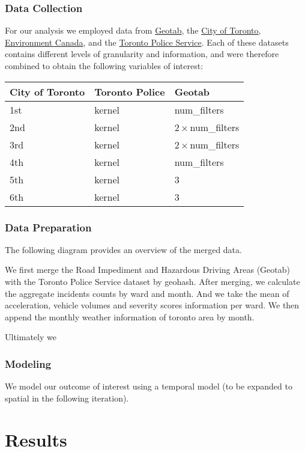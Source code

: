 \documentclass[]{article}
\begin{document}
\subsubsection{Data Collection}\label{data-collection}

For our analysis we employed data from
\href{https://www.data.geotab.com}{Geotab}, the
\href{https://www.toronto.ca/city-government/data-research-maps}{City of
Toronto},
\href{http://climate.weather.gc.ca/historical_data/search_historic_data_e.html}{Environment
Canada}, and the \href{http://data.torontopolice.on.ca}{Toronto Police
Service}. Each of these datasets contains different levels of
granularity and information, and were therefore combined to obtain the
following variables of interest:

\begin{longtable}[]{@{}lll@{}}
\toprule
City of Toronto & Toronto Police & Geotab\tabularnewline
\midrule
\endhead
1st & kernel & num\_filters\tabularnewline
2nd & kernel & \(2 \times\)num\_filters\tabularnewline
3rd & kernel & \(2 \times\)num\_filters\tabularnewline
4th & kernel & num\_filters\tabularnewline
5th & kernel & 3\tabularnewline
6th & kernel & 3\tabularnewline
\bottomrule
\end{longtable}

\subsubsection{Data Preparation}\label{data-preparation}

The following diagram provides an overview of the merged data.

We first merge the Road Impediment and Hazardous Driving Areas (Geotab)
with the Toronto Police Service dataset by geohash. After merging, we
calculate the aggregate incidents counts by ward and month. And we take
the mean of acceleration, vehicle volumes and severity scores
information per ward. We then append the monthly weather information of
toronto area by month.

Ultimately we

\subsubsection{Modeling}\label{modeling}

We model our outcome of interest using a temporal model (to be expanded
to spatial in the following iteration).

\section{Results}\label{results}
\end{document}
